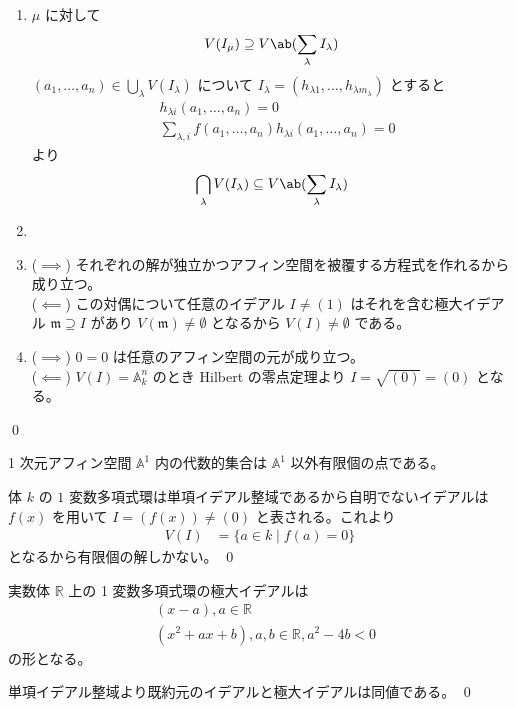 \documentclass[uplatex,dvipdfmx,a4paper,11pt]{jlreq}
\makeatletter
\newcommand{\RR}{\mathbb{R}}
\renewcommand{\AA}{\mathbb{A}}
\newcommand{\mm}{\mathfrak{m}}
\numberwithin{equation}{section}
\theoremstyle{definition}
\renewenvironment{proof}[1][\proofname]{\par
  \normalfont
  \topsep6\p@\@plus6\p@ \trivlist
  \item[\hskip\labelsep{\bfseries #1}\@addpunct{\bfseries}]\ignorespaces\quad\par
}{%
  \qed\endtrivlist\@endpefalse
}
\renewcommand\proofname{証明}
\makeatother
\begin{document}
\begin{proof}
\begin{enumerate}
    \item $\mu$ に対して
          \begin{align}
            V(I_\mu) \supseteq V\ab(\sum_\lambda I_\lambda)
          \end{align}
          $(a_1,\ldots,a_n)\in\bigcup_\lambda V(I_\lambda)$ について $I_\lambda = (h_{\lambda 1},\ldots,h_{\lambda m_\lambda})$ とすると
          \begin{align}
             & h_{\lambda i}(a_1,\ldots,a_n) = 0                                    \\
             & \sum_{\lambda, i} f(a_1,\ldots,a_n)h_{\lambda i}(a_1,\ldots,a_n) = 0
          \end{align}
          より
          \begin{align}
            \bigcap_\lambda V(I_\lambda) \subseteq V\ab(\sum_\lambda I_\lambda)
          \end{align}
    \item
    \item ($\implies$) それぞれの解が独立かつアフィン空間を被覆する方程式を作れるから成り立つ。 \\
          ($\impliedby$) この対偶について任意のイデアル $I \neq (1)$ はそれを含む極大イデアル $\mm\supseteq I$ があり $V(\mm) \neq \emptyset$ となるから $V(I) \neq \emptyset$ である。
    \item ($\implies$) $0 = 0$ は任意のアフィン空間の元が成り立つ。 \\
          ($\impliedby$) $V(I) = \AA_k^n$ のとき Hilbert の零点定理より $I = \sqrt{(0)} = (0)$ となる。
  \end{enumerate}
\end{proof}

\begin{proposition}
  1 次元アフィン空間 $\AA^1$ 内の代数的集合は $\AA^1$ 以外有限個の点である。
\end{proposition}
\begin{proof}
  体 $k$ の $1$ 変数多項式環は単項イデアル整域であるから自明でないイデアルは $f(x)$ を用いて $I = (f(x)) \neq (0)$ と表される。これより
  \begin{align}
    V(I) & = \lbrace a\in k\mid f(a) = 0\rbrace
  \end{align}
  となるから有限個の解しかない。
\end{proof}


\begin{proposition}
  実数体 $\RR$ 上の 1 変数多項式環の極大イデアルは
  \begin{align}
     & (x - a), a\in\RR                        \\
     & (x^2 + ax + b), a,b\in\RR, a^2 - 4b < 0
  \end{align}
  の形となる。
\end{proposition}
\begin{proof}
  単項イデアル整域より既約元のイデアルと極大イデアルは同値である。
\end{proof}
\end{document}
